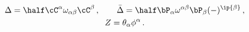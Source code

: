 \begin{equation}
\begin{gathered}
\Delta=\half \cC^\alpha \omega_{\alpha\beta}\cC^\beta\,, \qquad 
\bar\Delta=\half \bP_\alpha \omega^{\alpha\beta}\bP_\beta(-)^{\ip{\beta}}\,,\\
Z=\theta_\alpha \phi^\alpha\,.
\end{gathered}
\end{equation}

